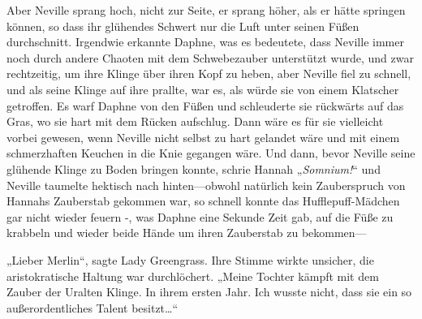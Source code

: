 Aber Neville sprang hoch, nicht zur Seite, er sprang höher, als er hätte springen können, so dass ihr glühendes Schwert nur die Luft unter seinen Füßen durchschnitt. Irgendwie erkannte Daphne, was es bedeutete, dass Neville immer noch durch andere Chaoten mit dem Schwebezauber unterstützt wurde, und zwar rechtzeitig, um ihre Klinge über ihren Kopf zu heben, aber Neville fiel zu schnell, und als seine Klinge auf ihre prallte, war es, als würde sie von einem Klatscher getroffen. Es warf Daphne von den Füßen und schleuderte sie rückwärts auf das Gras, wo sie hart mit dem Rücken aufschlug. Dann wäre es für sie vielleicht vorbei gewesen, wenn Neville nicht selbst zu hart gelandet wäre und mit einem schmerzhaften Keuchen in die Knie gegangen wäre. Und dann, bevor Neville seine glühende Klinge zu Boden bringen konnte, schrie Hannah „\emph{Somnium!}“ und Neville taumelte hektisch nach hinten—obwohl natürlich kein Zauberspruch von Hannahs Zauberstab gekommen war, so schnell konnte das Hufflepuff-Mädchen gar nicht wieder feuern -, was Daphne eine Sekunde Zeit gab, auf die Füße zu krabbeln und wieder beide Hände um ihren Zauberstab zu bekommen—

\later

„Lieber Merlin“, sagte Lady Greengrass. Ihre Stimme wirkte unsicher, die aristokratische Haltung war durchlöchert. „Meine Tochter kämpft mit dem Zauber der Uralten Klinge. In ihrem ersten Jahr. Ich wusste nicht, dass sie ein so außerordentliches Talent besitzt…“

